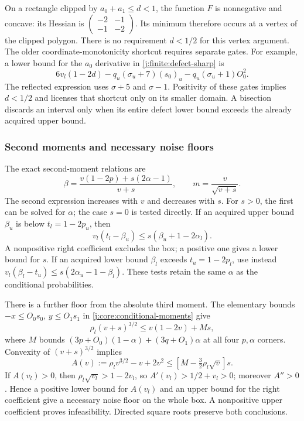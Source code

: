 On a rectangle clipped by $a_0+a_1\le d<1$, the function $F$ is
nonnegative and concave: its Hessian is
$\left(\begin{smallmatrix}-2&-1\\-1&-2\end{smallmatrix}\right)$.
Its minimum therefore occurs at a vertex of the clipped polygon.
There is no requirement $d<1/2$ for this vertex argument.
The older coordinate-monotonicity shortcut requires separate gates.
For example, a lower bound for the $a_0$ derivative in
\eqref{j:finite:defect-sharp} is
\[
 6v_l(1-2d)-q_u(\sigma_u+7)(s_0)_u
                       -q_u(\sigma_u+1)O_0^2.
\]
The reflected expression uses $\sigma+5$ and $\sigma-1$.
Positivity of these gates implies $d<1/2$ and licenses that shortcut
only on its smaller domain. A bisection discards an interval only when
its entire defect lower bound exceeds the already acquired upper bound.

\subsubsection{Second moments and necessary noise floors}
The exact second-moment relations are
\begin{equation}\label{j:finite:beta-noise}
 \beta=\frac{v(1-2p)+s(2\alpha-1)}{v+s},\qquad
 m=\frac{v}{\sqrt{v+s}}.
\end{equation}
The second expression increases with $v$ and decreases with $s$.
For $s>0$, the first can be solved for $\alpha$; the case $s=0$
is tested directly. If an acquired upper bound $\beta_u$ is below
$t_l=1-2p_u$, then
\[
 v_l(t_l-\beta_u)\le s(\beta_u+1-2\alpha_l).
\]
A nonpositive right coefficient excludes the box; a positive one
gives a lower bound for $s$. If an acquired lower bound $\beta_l$
exceeds $t_u=1-2p_l$, use instead
$v_l(\beta_l-t_u)\le s(2\alpha_u-1-\beta_l)$.
These tests retain the same $\alpha$ as the conditional probabilities.

There is a further floor from the absolute third moment. The elementary
bounds $-x\le O_0s_0$, $y\le O_1s_1$ in
\eqref{j:core:conditional-moments} give
\[
 \rho_l(v+s)^{3/2}\le v(1-2v)+Ms,
\]
where $M$ bounds
$(3p+O_0)(1-\alpha)+(3q+O_1)\alpha$ at all four
$p,\alpha$ corners. Convexity of $(v+s)^{3/2}$ implies
\[
 A(v):=\rho_l v^{3/2}-v+2v^2
 \le [M-\tfrac32\rho_l\sqrt v]s.
\]
If $A(v_l)>0$, then
$\rho_l\sqrt{v_l}>1-2v_l$, so
$A'(v_l)>1/2+v_l>0$; moreover $A''>0$.
Hence a positive lower bound for $A(v_l)$ and an upper bound for
the right coefficient give a necessary noise floor on the whole box.
A nonpositive upper coefficient proves infeasibility. Directed square
roots preserve both conclusions.

